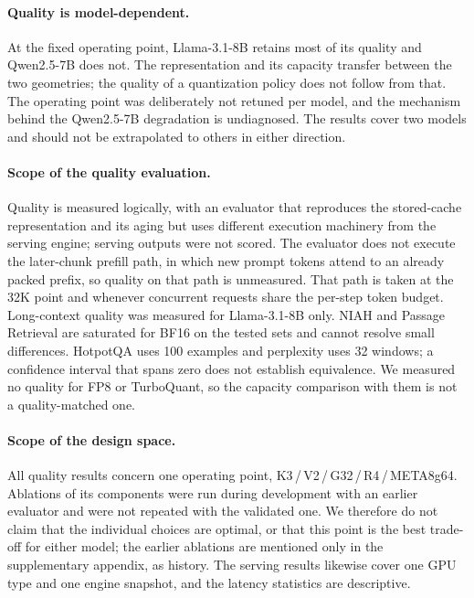 \documentclass{article}
\begin{document}
\paragraph{Quality is model-dependent.}
At the fixed operating point, Llama-3.1-8B retains most of its quality and Qwen2.5-7B does not. The
representation and its capacity transfer between the two geometries; the quality of a quantization
policy does not follow from that. The operating point was deliberately not retuned per model, and the
mechanism behind the Qwen2.5-7B degradation is undiagnosed. The results cover two models and should
not be extrapolated to others in either direction.

\paragraph{Scope of the quality evaluation.}
Quality is measured logically, with an evaluator that reproduces the stored-cache representation and
its aging but uses different execution machinery from the serving engine; serving outputs were not
scored. The evaluator does not execute the later-chunk prefill path, in which new prompt tokens attend
to an already packed prefix, so quality on that path is unmeasured. That path is taken at the 32K point
and whenever concurrent requests share the per-step token budget. Long-context quality was measured
for Llama-3.1-8B only. NIAH and Passage Retrieval are saturated for BF16 on the tested sets and cannot
resolve small differences. HotpotQA uses 100 examples and perplexity uses 32 windows; a confidence
interval that spans zero does not establish equivalence. We measured no quality for FP8 or TurboQuant,
so the capacity comparison with them is not a quality-matched one.

\paragraph{Scope of the design space.}
All quality results concern one operating point, K3\,/\,V2\,/\,G32\,/\,R4\,/\,META8g64. Ablations of its
components were run during development with an earlier evaluator and were not repeated with the
validated one. We therefore do not claim that the individual choices are optimal, or that this point
is the best trade-off for either model; the earlier ablations are mentioned only in the supplementary appendix, as history.
The serving results likewise cover one GPU type and one engine snapshot, and the latency statistics
are descriptive.
\end{document}
